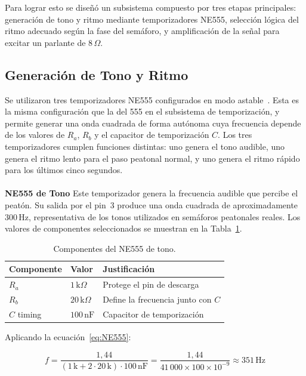 \documentclass[12pt,onecolumn]{IEEEtran}
\begin{document}
Para lograr esto se diseñó un subsistema compuesto por tres etapas principales: generación de tono y ritmo mediante temporizadores NE555, selección lógica del ritmo adecuado según la fase del semáforo, y amplificación de la señal para excitar un parlante de $8\,\Omega$.

\subsection{Generación de Tono y Ritmo}

Se utilizaron tres temporizadores NE555 configurados en modo astable~\cite{ne555art}. Esta es la misma configuración que la del 555 en el subsistema de temporización, y permite generar una onda cuadrada de forma autónoma cuya frecuencia depende de los valores de $R_a$, $R_b$ y el capacitor de temporización $C$. Los tres temporizadores cumplen funciones distintas: uno genera el tono audible, uno genera el ritmo lento para el paso peatonal normal, y uno genera el ritmo rápido para los últimos cinco segundos.
\\
\\
\textbf{NE555 de Tono}
Este temporizador genera la frecuencia audible que percibe el peatón. Su salida por el pin~3 produce una onda cuadrada de aproximadamente $300\,\text{Hz}$, representativa de los tonos utilizados en semáforos peatonales reales. Los valores de componentes seleccionados se muestran en la Tabla~\ref{tab:555tono}.

\begin{table}[H]
\centering
\caption{Componentes del NE555 de tono.}
\label{tab:555tono}
\begin{tabular}{lll}
\toprule
\textbf{Componente} & \textbf{Valor} & \textbf{Justificación} \\
\midrule
$R_a$       & $1\,\text{k}\Omega$   & Protege el pin de descarga \\
$R_b$       & $20\,\text{k}\Omega$  & Define la frecuencia junto con $C$ \\
$C$ timing  & $100\,\text{nF}$      & Capacitor de temporización \\
\bottomrule
\end{tabular}
\end{table}

Aplicando la ecuación~\eqref{eq:NE555}:

\begin{equation}
    f = \frac{1{,}44}{(1\,\text{k} + 2\cdot 20\,\text{k})\cdot 100\,\text{nF}}
      = \frac{1{,}44}{41\,000 \times 100\times10^{-9}}
      \approx 351\,\text{Hz}
\end{equation}
\end{document}
